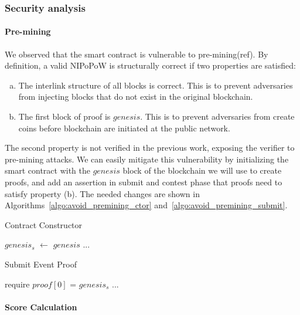 

\subsubsection{Security analysis}

\paragraph{Pre-mining} We observed that the smart contract is vulnerable to
pre-mining(ref). By definition, a valid NIPoPoW is structurally correct if two
properties are satisfied:

\begin{enumerate}[(a)]

\item The interlink structure of all blocks is correct. This is to prevent
    adversaries from injecting blocks that do not exist in the original
    blockchain.

\item The first block of proof is $genesis$. This is to prevent adversaries
    from create coins before blockchain are initiated at the public network.

\end{enumerate}

The second property is not verified in the previous work, exposing the verifier
to pre-mining attacks. We can easily mitigate this vulnerability by
initializing the smart contract with the $genesis$ block of the blockchain we
will use to create proofs, and add an assertion in submit and contest phase
that proofs need to satisfy property (b). The needed changes are shown in
Algorithms~\ref{algo:avoid_premining_ctor}
and~\ref{algo:avoid_premining_submit}.

\begin{algorithm}
    \caption{Contract Constructor}
    \label{algo:avoid_premining_ctor}
    $genesis_{s}$ $\leftarrow$ $genesis$\newline
    ...
\end{algorithm}
\vspace{-0.7cm}
\begin{algorithm}
    \caption{Submit Event Proof}
    \label{algo:avoid_premining_submit}
    require $proof[0]$ = $genesis_{s}$\newline
    ...
\end{algorithm}

\bigbreak
\paragraph{Score Calculation}


